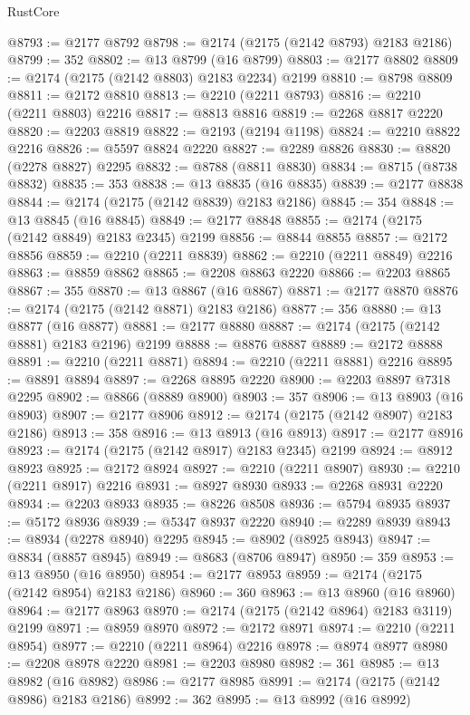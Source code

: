 \begin{lexlean}{RustCore}
\begin{coremodule}
@8793 := @2177 @8792
@8798 := @2174 (@2175 (@2142 @8793) @2183 @2186)
@8799 := 352
@8802 := @13 @8799 (@16 @8799)
@8803 := @2177 @8802
@8809 := @2174 (@2175 (@2142 @8803) @2183 @2234) @2199
@8810 := @8798 @8809
@8811 := @2172 @8810
@8813 := @2210 (@2211 @8793)
@8816 := @2210 (@2211 @8803) @2216
@8817 := @8813 @8816
@8819 := @2268 @8817 @2220
@8820 := @2203 @8819
@8822 := @2193 (@2194 @1198)
@8824 := @2210 @8822 @2216
@8826 := @5597 @8824 @2220
@8827 := @2289 @8826
@8830 := @8820 (@2278 @8827) @2295
@8832 := @8788 (@8811 @8830)
@8834 := @8715 (@8738 @8832)
@8835 := 353
@8838 := @13 @8835 (@16 @8835)
@8839 := @2177 @8838
@8844 := @2174 (@2175 (@2142 @8839) @2183 @2186)
@8845 := 354
@8848 := @13 @8845 (@16 @8845)
@8849 := @2177 @8848
@8855 := @2174 (@2175 (@2142 @8849) @2183 @2345) @2199
@8856 := @8844 @8855
@8857 := @2172 @8856
@8859 := @2210 (@2211 @8839)
@8862 := @2210 (@2211 @8849) @2216
@8863 := @8859 @8862
@8865 := @2208 @8863 @2220
@8866 := @2203 @8865
@8867 := 355
@8870 := @13 @8867 (@16 @8867)
@8871 := @2177 @8870
@8876 := @2174 (@2175 (@2142 @8871) @2183 @2186)
@8877 := 356
@8880 := @13 @8877 (@16 @8877)
@8881 := @2177 @8880
@8887 := @2174 (@2175 (@2142 @8881) @2183 @2196) @2199
@8888 := @8876 @8887
@8889 := @2172 @8888
@8891 := @2210 (@2211 @8871)
@8894 := @2210 (@2211 @8881) @2216
@8895 := @8891 @8894
@8897 := @2268 @8895 @2220
@8900 := @2203 @8897 @7318 @2295
@8902 := @8866 (@8889 @8900)
@8903 := 357
@8906 := @13 @8903 (@16 @8903)
@8907 := @2177 @8906
@8912 := @2174 (@2175 (@2142 @8907) @2183 @2186)
@8913 := 358
@8916 := @13 @8913 (@16 @8913)
@8917 := @2177 @8916
@8923 := @2174 (@2175 (@2142 @8917) @2183 @2345) @2199
@8924 := @8912 @8923
@8925 := @2172 @8924
@8927 := @2210 (@2211 @8907)
@8930 := @2210 (@2211 @8917) @2216
@8931 := @8927 @8930
@8933 := @2268 @8931 @2220
@8934 := @2203 @8933
@8935 := @8226 @8508
@8936 := @5794 @8935
@8937 := @5172 @8936
@8939 := @5347 @8937 @2220
@8940 := @2289 @8939
@8943 := @8934 (@2278 @8940) @2295
@8945 := @8902 (@8925 @8943)
@8947 := @8834 (@8857 @8945)
@8949 := @8683 (@8706 @8947)
@8950 := 359
@8953 := @13 @8950 (@16 @8950)
@8954 := @2177 @8953
@8959 := @2174 (@2175 (@2142 @8954) @2183 @2186)
@8960 := 360
@8963 := @13 @8960 (@16 @8960)
@8964 := @2177 @8963
@8970 := @2174 (@2175 (@2142 @8964) @2183 @3119) @2199
@8971 := @8959 @8970
@8972 := @2172 @8971
@8974 := @2210 (@2211 @8954)
@8977 := @2210 (@2211 @8964) @2216
@8978 := @8974 @8977
@8980 := @2208 @8978 @2220
@8981 := @2203 @8980
@8982 := 361
@8985 := @13 @8982 (@16 @8982)
@8986 := @2177 @8985
@8991 := @2174 (@2175 (@2142 @8986) @2183 @2186)
@8992 := 362
@8995 := @13 @8992 (@16 @8992)

\end{coremodule}
\end{lexlean}
